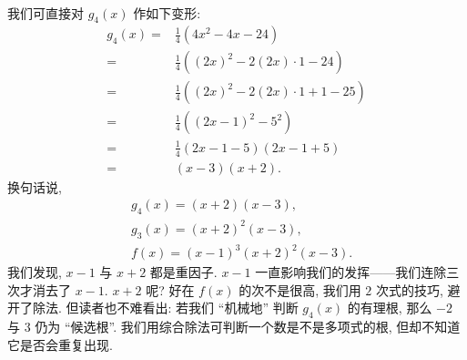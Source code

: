 \begin{example}
\begin{align*}
    \end{align*}
    我们可直接对 $g_4 (x)$ 作如下变形:
    \begin{align*}
        g_4 (x)
        = {} & \frac{1}{4} (4x^2 - 4x - 24)                   \\
        = {} & \frac{1}{4} ((2x)^2 - 2 (2x) \cdot 1 - 24)     \\
        = {} & \frac{1}{4} ((2x)^2 - 2 (2x) \cdot 1 + 1 - 25) \\
        = {} & \frac{1}{4} ((2x - 1)^2 - 5^2)                 \\
        = {} & \frac{1}{4} (2x - 1 - 5) (2x - 1 + 5)          \\
        = {} & (x - 3) (x + 2).
    \end{align*}
    换句话说,
    \begin{align*}
         & g_4 (x) = (x + 2) (x - 3),          \\
         & g_3 (x) = (x + 2)^2 (x - 3),        \\
         & f(x) = (x - 1)^3 (x + 2)^2 (x - 3).
    \end{align*}
    我们发现, $x-1$ 与 $x+2$ 都是重因子. $x-1$ 一直影响我们的发挥——我们连除三次才消去了 $x-1$. $x+2$ 呢? 好在 $f(x)$ 的次不是很高, 我们用 $2$ 次式的技巧, 避开了除法. 但读者也不难看出: 若我们 ``机械地'' 判断 $g_4 (x)$ 的有理根, 那么 $-2$ 与 $3$ 仍为 ``候选根''. 我们用综合除法可判断一个数是不是多项式的根, 但却不知道它是否会重复出现.
\end{example}

